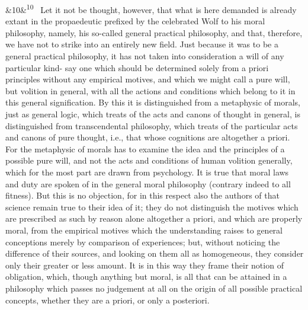 \documentclass[12pt]{article}
\newcommand{\para}[1][]{\par\noindent\ifx&#1&\else\textsuperscript{\footnotesize #1}~\fi}
\begin{document}
\para[10] Let it not be thought, however, that what is here demanded is already extant in the propaedeutic prefixed by the celebrated Wolf to his moral philosophy, namely, his so-called general practical philosophy, and that, therefore, we have not to strike into an entirely new field. Just because it was to be a general practical philosophy, it has not taken into consideration a will of any particular kind- say one which should be determined solely from a priori principles without any empirical motives, and which we might call a pure will, but volition in general, with all the actions and conditions which belong to it in this general signification. By this it is distinguished from a metaphysic of morals, just as general logic, which treats of the acts and canons of thought in general, is distinguished from transcendental philosophy, which treats of the particular acts and canons of pure thought, i.e., that whose cognitions are altogether a priori. For the metaphysic of morals has to examine the idea and the principles of a possible pure will, and not the acts and conditions of human volition generally, which for the most part are drawn from psychology. It is true that moral laws and duty are spoken of in the general moral philosophy (contrary indeed to all fitness). But this is no objection, for in this respect also the authors of that science remain true to their idea of it; they do not distinguish the motives which are prescribed as such by reason alone altogether a priori, and which are properly moral, from the empirical motives which the understanding raises to general conceptions merely by comparison of experiences; but, without noticing the difference of their sources, and looking on them all as homogeneous, they consider only their greater or less amount. It is in this way they frame their notion of obligation, which, though anything but moral, is all that can be attained in a philosophy which passes no judgement at all on the origin of all possible practical concepts, whether they are a priori, or only a posteriori.
\end{document}
